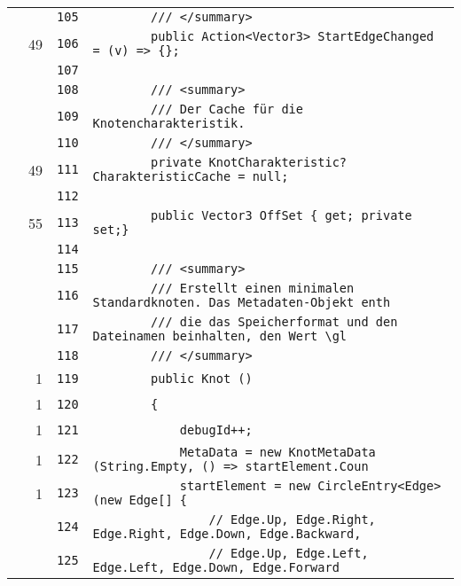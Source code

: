 \documentclass[a4paper,10pt]{article}
\begin{document}
\begin{longtable}[l]{lrrl}
\cellcolor{gray} &  & \verb~105~ & \verb~        /// </summary>~\\
\cellcolor{green} & 49 & \verb~106~ & \verb~        public Action<Vector3> StartEdgeChanged = (v) => {};~\\
\cellcolor{gray} &  & \verb~107~ & \verb~~\\
\cellcolor{gray} &  & \verb~108~ & \verb~        /// <summary>~\\
\cellcolor{gray} &  & \verb~109~ & \verb~        /// Der Cache für die Knotencharakteristik.~\\
\cellcolor{gray} &  & \verb~110~ & \verb~        /// </summary>~\\
\cellcolor{green} & 49 & \verb~111~ & \verb~        private KnotCharakteristic? CharakteristicCache = null;~\\
\cellcolor{gray} &  & \verb~112~ & \verb~~\\
\cellcolor{green} & 55 & \verb~113~ & \verb~        public Vector3 OffSet { get; private set;}~\\
\cellcolor{gray} &  & \verb~114~ & \verb~~\\
\cellcolor{gray} &  & \verb~115~ & \verb~        /// <summary>~\\
\cellcolor{gray} &  & \verb~116~ & \verb~        /// Erstellt einen minimalen Standardknoten. Das Metadaten-Objekt enth~\\
\cellcolor{gray} &  & \verb~117~ & \verb~        /// die das Speicherformat und den Dateinamen beinhalten, den Wert \gl~\\
\cellcolor{gray} &  & \verb~118~ & \verb~        /// </summary>~\\
\cellcolor{green} & 1 & \verb~119~ & \verb~        public Knot ()~\\
\cellcolor{green} & 1 & \verb~120~ & \verb~        {~\\
\cellcolor{green} & 1 & \verb~121~ & \verb~            debugId++;~\\
\cellcolor{green} & 1 & \verb~122~ & \verb~            MetaData = new KnotMetaData (String.Empty, () => startElement.Coun~\\
\cellcolor{green} & 1 & \verb~123~ & \verb~            startElement = new CircleEntry<Edge> (new Edge[] {~\\
\cellcolor{gray} &  & \verb~124~ & \verb~                // Edge.Up, Edge.Right, Edge.Right, Edge.Down, Edge.Backward,~\\
\cellcolor{gray} &  & \verb~125~ & \verb~                // Edge.Up, Edge.Left, Edge.Left, Edge.Down, Edge.Forward~\\

\end{longtable}
\end{document}
